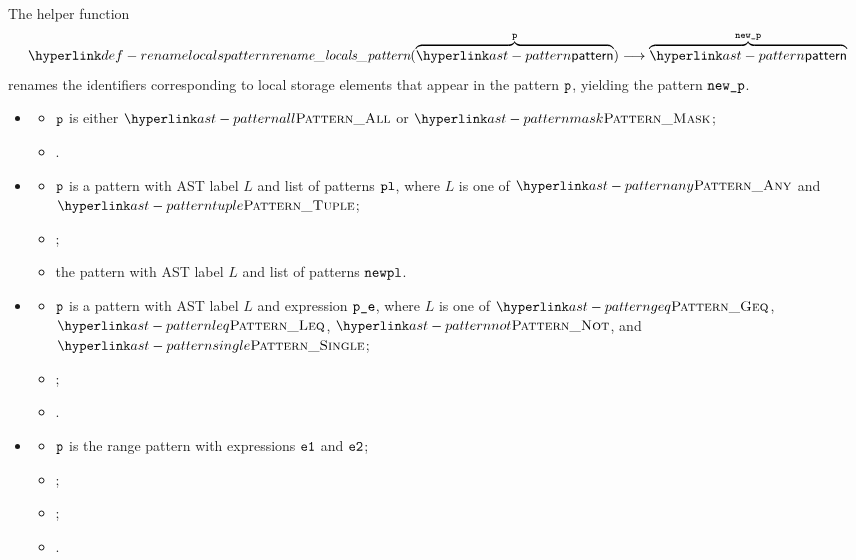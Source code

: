 \hypertarget{def-renamelocalspattern}{}
The helper function
\[
\renamelocalspattern(\overname{\pattern}{\vp}) \aslto \overname{\pattern}{\newp}
\]
renames the identifiers corresponding to local storage elements that appear in the
pattern $\vp$, yielding the pattern $\newp$.

\ProseParagraph
\OneApplies
\begin{itemize}
  \item {}
  \begin{itemize}
    \item $\vp$ is either $\PatternAll$ or $\PatternMask$;
    \item \Proseeqdef{$\newp$}{$\vp$}.
  \end{itemize}

  \item {}
  \begin{itemize}
    \item $\vp$ is a pattern with AST label $L$ and list of patterns $\texttt{pl}$,
          where $L$ is one of $\PatternAny$ and $\PatternTuple$;
    \item {};
    \item the pattern with AST label $L$ and list of patterns $\texttt{newpl}$.
  \end{itemize}

  \item {}
  \begin{itemize}
    \item $\vp$ is a pattern with AST label $L$ and expression $\texttt{p\_e}$,
          where $L$ is one of $\PatternGeq$, $\PatternLeq$, $\PatternNot$, and
          $\PatternSingle$;
    \item \Proserenamelocalsexpr{$\veone$}{$\veonep$};
    \item {}.
  \end{itemize}

  \item {}
  \begin{itemize}
    \item $\vp$ is the range pattern with expressions $\veone$ and $\vetwo$;
    \item \Proserenamelocalsexpr{$\veone$}{$\veonep$};
    \item \Proserenamelocalsexpr{$\vetwo$}{$\vetwop$};
    \item {}.
  \end{itemize}
\end{itemize}

